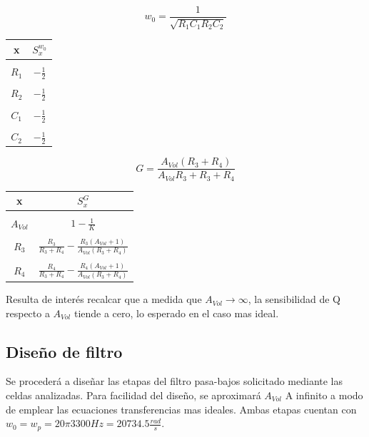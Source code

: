 $$ w_{0} = \frac{1}{\sqrt{R_{1}C_{1}R_{2}C_{2}}} $$

\begin{table}[H]
\centering
\begin{tabular}{c|c}
x       & $S^{w_{0}}_{x}$ \\ \hline
\\
$R_{1}$ & $-\frac{1}{2}$
\\
\\
$R_{2}$ & $-\frac{1}{2}$
\\
\\
$C_{1}$ & $-\frac{1}{2}$
\\
\\
$C_{2}$ & $-\frac{1}{2}$
\\
\end{tabular}
\label{table:SW}
\end{table}

$$G = \frac{A_{Vol}(R_{3} + R_{4})}{A_{Vol}R_{3} + R_{3} + R_{4}}$$

\begin{table}[H]
\centering
\begin{tabular}{c|c}
x         & $S^{G}_{x}$                                                                 \\ \hline
\\
$A_{Vol}$ & $1 - \frac{1}{K}$                                                           \\
\\
$R_{3}$   & $\frac{R_{3}}{R_{3}+R_{4}} - \frac{R_{3}(A_{Vol}+1)}{A_{Vol}(R_{3}+R_{4})}$ \\
\\
$R_{4}$   & $\frac{R_{4}}{R_{3}+R_{4}} - \frac{R_{4}(A_{Vol}+1)}{A_{Vol}(R_{3}+R_{4})}$
\\
\end{tabular}
\label{table:SG}
\end{table}

Resulta de interés recalcar que a medida que $A_{Vol} \rightarrow \infty$, la sensibilidad de Q respecto a $A_{Vol}$ tiende a cero, lo esperado en el caso mas ideal. 

\subsection{Diseño de filtro}


Se procederá a diseñar las etapas del filtro pasa-bajos solicitado mediante las celdas analizadas. Para facilidad del diseño, se aproximará $A_{Vol}$ A infinito a modo de emplear las ecuaciones transferencias mas ideales. Ambas etapas cuentan con $w_{0} = w_{p} = 20 \pi 3300 Hz = 20734.5 \frac{rad}{s}$. 

